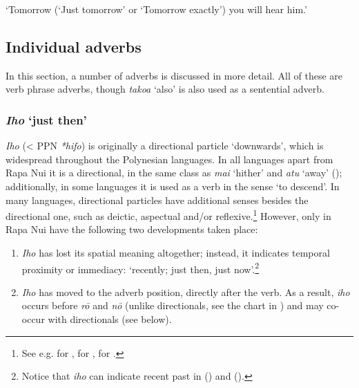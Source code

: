 \glt 
‘Tomorrow (‘Just tomorrow’ or ‘Tomorrow exactly’) you will hear him.’ \textstyleExampleref{[Act. 25:22]}
\z

\subsection{Individual adverbs}\label{sec:4.5.3}
In this section, a number of adverbs is discussed in more detail. All of these are verb phrase adverbs, though \textit{tako{\ꞌ}a} ‘also’ is also used as a sentential adverb.

\subsubsection{\textit{Iho} ‘just then’}\label{sec:4.5.3.1}

\textit{Iho} ({\textless} PPN \textit{*hifo}) is originally a directional particle ‘downwards’, which is widespread throughout the Polynesian languages. In all languages apart from Rapa Nui it is a directional, in the same class as \textit{mai} ‘hither’ and \textit{atu} ‘away’ (); additionally, in some languages it is used as a verb in the sense ‘to descend’. In many languages, directional particles have additional senses besides the directional one, such as deictic, aspectual and/or reflexive.\footnote{\label{fn:194}See e.g. \citet[427]{Cablitz2006} for , \citet[175, 217, 330]{AcadémieTahitienne1986} for , \citet[92–95]{ElbertPukui1979} for .} However, only in Rapa Nui have the following two developments taken place: 

\begin{enumerate}
\item 
\textit{Iho} has lost its spatial meaning altogether; instead, it indicates temporal proximity or immediacy: ‘recently; just then, just now’.\footnote{\label{fn:195}Notice that \textit{iho} can indicate recent past in  (\citealt[92]{ElbertPukui1979}) and  (\citealt[175]{AcadémieTahitienne1986}).} 

\item 
\textit{Iho} has moved to the adverb position, directly after the verb. As a result, \textit{iho} occurs before \textit{rō} and \textit{nō} (unlike directionals, see the chart in ) and may co-occur with directionals (see  below).

\end{enumerate}

